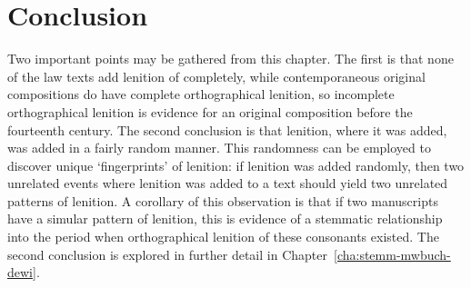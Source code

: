\section{Conclusion}
\label{sec:lawconclus}
Two important points may be gathered from this chapter. The first is that none of the law texts add lenition of  completely, while contemporaneous original compositions do have complete orthographical lenition, so incomplete orthographical lenition is evidence for an original composition before the fourteenth century. The second conclusion is that lenition, where it was added, was added in a fairly random manner. This randomness can be employed to discover unique `fingerprints' of lenition: if lenition was added randomly, then two unrelated events where lenition was added to a text should yield two unrelated patterns of lenition. A corollary of this observation is that if two manuscripts have a simular pattern of lenition, this is evidence of a stemmatic relationship into the period when orthographical lenition of these consonants existed. The second conclusion is explored in further detail in Chapter~\ref{cha:stemm-mwbuch-dewi}.



